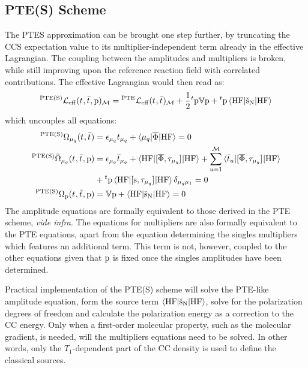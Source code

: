 \subsection*{PTE(S) Scheme}

The \acrshort{PTES} approximation can be brought one step further, by
truncating the \acrshort{CCS} expectation value to its multiplier-independent
term already in the effective Lagrangian.
The coupling between the amplitudes and multipliers is broken, while
still improving upon the reference reaction field with correlated
contributions.\autocite{Caricato2011-tx}
The effective Lagrangian would then read as:
\begin{equation}\label{eq:pte-s-cc}
    {}^{\mathrm{PTE(S)}}\mathcal{L}_\mathrm{eff}(t_{}, \bar{t}_{}, \mathrm{p})_\mathcal{M} =
  {}^\mathrm{PTE}\mathcal{L}_\mathrm{eff}(t_{}, \bar{t}_{})_\mathcal{M}
  + \frac{1}{2}{}^t\mathrm{p}\mathbb{V}\mathrm{p} + {}^t\mathrm{p}\braket{\mathrm{HF} | \check{\mathrm{s}}_{\mathrm{N}} | \mathrm{HF}}
\end{equation}
which uncouples all equations:
\begin{subequations}
  \begin{align}
  {}^{\mathrm{PTE(S)}}\Omega_{\mu_q}(t_{}, \bar{t}_{})  &=
   \epsilon_{\mu_q}t_{\mu_q} + \braket{\mu_q | \overline{\Phi} | \mathrm{HF}}
   = 0 \\
   {}^{\mathrm{PTE(S)}}\bar{\Omega}_{\mu_q}(t_{}, \bar{t}_{}, \mathrm{p}) &=
    \epsilon_{\mu_q}\bar{t}_{\mu_q} +
    \braket{\mathrm{HF} | [ \overline{\Phi}, \tau_{\mu_q} ]^{} | \mathrm{HF}} +
    \sum_{u=1}^{\mathcal{M}}\braket{\bar{t}_{u} |
    [ \overline{\Phi}, \tau_{\mu_q} ]^{} | \mathrm{HF}}
    \nonumber \\
    &+
    {}^t\mathrm{p}\braket{\mathrm{HF} | [ \mathrm{s}, \tau_{\mu_q} ]^{} | \mathrm{HF}}\delta_{\mu_q\mu_1}
    = 0 \\
    {}^{\mathrm{PTE(S)}}\Omega_{\mathrm{p}}(t_{}, \bar{t}_{}, \mathrm{p})
    &=
    \mathbb{V}\mathrm{p} + \braket{\mathrm{HF} | \check{\mathrm{s}}_{\mathrm{N}} | \mathrm{HF}} = 0
  \end{align}
\end{subequations}
The amplitude equations are formally equivalent to those derived in the
\acrshort{PTE} scheme, \emph{vide infra}. The equations for multipliers are also formally
equivalent to the \acrshort{PTE} equations, apart from the equation
determining the singles multipliers which features an additional term.
This term is not, however, coupled to the other equations given that
$\mathrm{p}$ is fixed once the singles amplitudes have been determined.

Practical implementation of the \acrshort{PTE(S)} scheme will solve the
\acrshort{PTE}-like amplitude equation, form the source term
$\braket{\mathrm{HF} | \check{\mathrm{s}}_\mathrm{N} | \mathrm{HF}}$, solve for
the polarization degrees of freedom and calculate the polarization
energy as a correction to the \acrshort{CC} energy.
Only when a first-order molecular property, such as the molecular
gradient, is needed, will the multipliers equations need to be solved.
In other words, only the $T_1$-dependent part of the \acrshort{CC} density is
used to define the classical sources.

